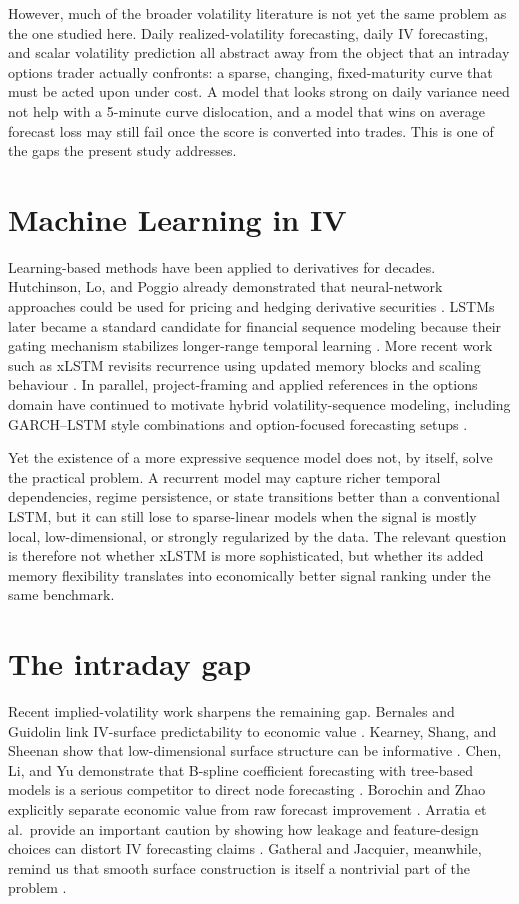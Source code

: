 \documentclass[12pt]{report}
\begin{document}
However, much of the broader volatility literature is not yet the same problem as the one studied here. Daily realized-volatility forecasting, daily IV forecasting, and scalar volatility prediction all abstract away from the object that an intraday options trader actually confronts: a sparse, changing, fixed-maturity curve that must be acted upon under cost. A model that looks strong on daily variance need not help with a 5-minute curve dislocation, and a model that wins on average forecast loss may still fail once the score is converted into trades. This is one of the gaps the present study addresses.

\section{Machine Learning in IV}
Learning-based methods have been applied to derivatives for decades. Hutchinson, Lo, and Poggio already demonstrated that neural-network approaches could be used for pricing and hedging derivative securities \citep{hutchinson1994}. LSTMs later became a standard candidate for financial sequence modeling because their gating mechanism stabilizes longer-range temporal learning \citep{hochreiter1997,fischer2018}. More recent work such as xLSTM revisits recurrence using updated memory blocks and scaling behaviour \citep{beck2024xlstm}. In parallel, project-framing and applied references in the options domain have continued to motivate hybrid volatility-sequence modeling, including GARCH--LSTM style combinations and option-focused forecasting setups \citep{hull2019framing,sullivan2019lstm,zhao2024garchlstm}.

Yet the existence of a more expressive sequence model does not, by itself, solve the practical problem. A recurrent model may capture richer temporal dependencies, regime persistence, or state transitions better than a conventional LSTM, but it can still lose to sparse-linear models when the signal is mostly local, low-dimensional, or strongly regularized by the data. The relevant question is therefore not whether xLSTM is more sophisticated, but whether its added memory flexibility translates into economically better signal ranking under the same benchmark.

\section{The intraday gap}
Recent implied-volatility work sharpens the remaining gap. Bernales and Guidolin link IV-surface predictability to economic value \citep{bernales2014}. Kearney, Shang, and Sheenan show that low-dimensional surface structure can be informative \citep{kearney2019}. Chen, Li, and Yu demonstrate that B-spline coefficient forecasting with tree-based models is a serious competitor to direct node forecasting \citep{chen2024bspline}. Borochin and Zhao explicitly separate economic value from raw forecast improvement \citep{borochin2025}. Arratia et al.\ provide an important caution by showing how leakage and feature-design choices can distort IV forecasting claims \citep{arratia2025}. Gatheral and Jacquier, meanwhile, remind us that smooth surface construction is itself a nontrivial part of the problem \citep{gatheral2014arbitrage}.
\end{document}
